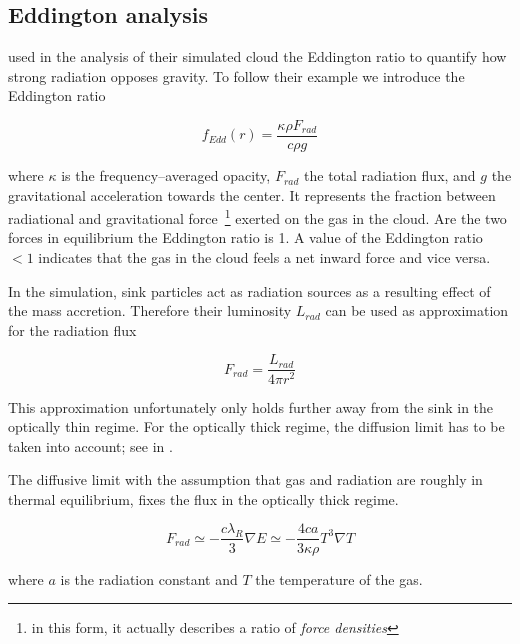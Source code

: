 \subsection{Eddington analysis}
\label{subsec:Eddington_ratio}

\citet{Skinner_Ostriker} used in the analysis of their simulated cloud the Eddington ratio to quantify how strong radiation opposes gravity.
To follow their example we introduce the Eddington ratio

\begin{equation}
  f_{Edd}(r) = \frac{\kappa\rho F_{rad}}{c \rho g}
\label{eq:Eddington_ratio}
\end{equation}

where $\kappa$ is the frequency--averaged opacity, $F_{rad}$ the total radiation flux, and $g$ the gravitational acceleration towards the center.
It represents the fraction between radiational and gravitational force~\footnote{in this form, it actually describes a ratio of \textit{force densities}} exerted on the gas in the cloud.
Are the two forces in equilibrium the Eddington ratio is 1.
A value of the Eddington ratio $< 1$ indicates that the gas in the cloud feels a net inward force and vice versa.

In the simulation, sink particles act as radiation sources as a resulting effect of the mass accretion.
Therefore their luminosity $L_{rad}$ can be used as approximation for the radiation flux

\begin{equation}
  F_{rad} = \frac{L_{rad}}{4\pi r^{2}}
\end{equation}

This approximation unfortunately only holds further away from the sink in the optically thin regime.
For the optically thick regime, the diffusion limit has to be taken into account; see in .

The diffusive limit with the assumption that gas and radiation are roughly in thermal equilibrium, fixes the flux in the optically thick regime.

\begin{equation}
  F_{rad} \simeq -\frac{c\lambda_{R}}{3} \nabla E \simeq - \frac{4ca}{3\kappa\rho} T^{3} \nabla T
\end{equation}

where $a$ is the radiation constant and $T$ the temperature of the gas.

